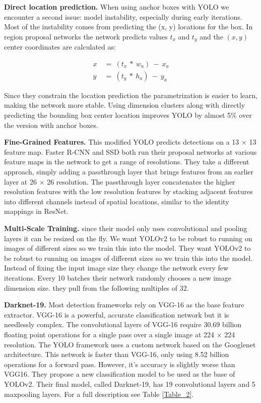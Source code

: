 \documentclass{ieeeaccess}
\begin{document}
\textbf{Direct location prediction.} When using anchor boxes with YOLO we encounter a second issue: model instability, especially during early iterations. Most of the instability comes from predicting the (x, y) locations for the box.  In region proposal networks the network predicts values $t_x$ and $t_y$ and the $(x, y)$ center coordinates are calculated as:

\begin{equation}
	\label{equation4}
	\begin{split}
	 x \ & = \ (t_x \ * \ w_a) \ - \ x_a \\
	 y \ & = \ (t_y \ * \ h_a) \ - \ y_a
	\end{split}
\end{equation}

Since they constrain the location prediction the parametrization is easier to learn, making the network
more stable. Using dimension clusters along with directly predicting the bounding box center location improves YOLO by almost 5\% over the version with anchor boxes.

\textbf{Fine-Grained Features.} This modified YOLO predicts detections on a 13 × 13 feature map. Faster R-CNN and SSD both run their proposal networks at various feature maps in the network to get a range of resolutions. They take a different approach, simply adding a passthrough layer that brings features from an earlier layer at 26 × 26 resolution. The passthrough layer concatenates the higher resolution features with the low resolution features by stacking adjacent features into different channels instead of spatial locations, similar to the identity mappings in ResNet. 

\textbf{Multi-Scale Training.} since their model only uses convolutional and pooling layers it can be resized on the fly. We want YOLOv2 to be robust to running on images of different sizes so we train this into the model. They want YOLOv2 to be robust to running on images of different sizes so we train this into the model. Instead of fixing the input image size they change the network every few iterations. Every 10 batches their network randomly chooses a new image dimension size. they pull from the following multiples of 32.

\textbf{Darknet-19.} Most detection frameworks rely on VGG-16 as the base feature extractor. VGG-16 is a powerful, accurate classification network but it is needlessly complex. The convolutional layers of VGG-16 require 30.69 billion floating point operations for a single pass over a single image at 224 × 224 resolution. The YOLO framework uses a custom network based on the Googlenet architecture. This network is faster than VGG-16, only using 8.52 billion operations for a forward pass. However, it’s accuracy is slightly worse than VGG16. They propose a new classification model to be used as the base of YOLOv2. Their final model, called Darknet-19, has 19 convolutional layers and 5 maxpooling layers. For a full description see Table \ref{Table_2}.
\end{document}
